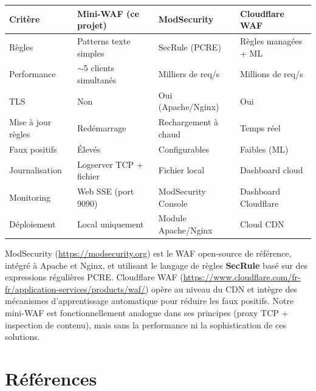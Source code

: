 \documentclass[12pt,a4paper]{article}
\begin{document}
\begin{tabularx}{\linewidth}{lXXX}
  \toprule
  \textbf{Critère} & \textbf{Mini-WAF (ce projet)} & \textbf{ModSecurity} & \textbf{Cloudflare WAF} \\
  \midrule
  Règles             & Patterns texte simples    & SecRule (PCRE)            & Règles managées + ML \\
  Performance        & $\sim$5 clients simultanés & Milliers de req/s        & Millions de req/s \\
  TLS                & Non                       & Oui (Apache/Nginx)        & Oui \\
  Mise à jour règles & Redémarrage               & Rechargement à chaud      & Temps réel \\
  Faux positifs      & Élevés                    & Configurables             & Faibles (ML) \\
  Journalisation     & Logserver TCP + fichier   & Fichier local             & Dashboard cloud \\
  Monitoring         & Web SSE (port 9090)       & ModSecurity Console       & Dashboard Cloudflare \\
  Déploiement        & Local uniquement          & Module Apache/Nginx       & Cloud CDN \\
  \bottomrule
\end{tabularx}

\vspace{0.8em}

ModSecurity (\url{https://modsecurity.org}) est le WAF open-source de référence, intégré à Apache et Nginx, et utilisant le langage de règles \textbf{SecRule} basé sur des expressions régulières PCRE. Cloudflare WAF (\url{https://www.cloudflare.com/fr-fr/application-services/products/waf/}) opère au niveau du CDN et intègre des mécanismes d'apprentissage automatique pour réduire les faux positifs. Notre mini-WAF est fonctionnellement analogue dans ses principes (proxy TCP + inspection de contenu), mais sans la performance ni la sophistication de ces solutions.

\section{Références}
\end{document}
